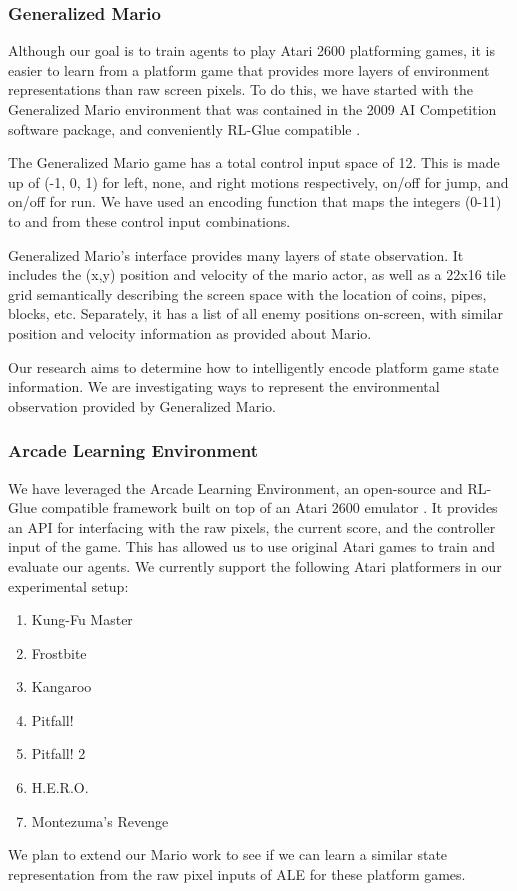 \documentclass{article}
\begin{document}
\subsubsection{Generalized Mario}
Although our goal is to train agents to play Atari 2600 platforming games, it is easier to learn from a platform game that provides more layers of environment representations than raw screen pixels. To do this, we have started with the Generalized Mario environment that was contained in the 2009 AI Competition software package, and conveniently RL-Glue compatible \cite{Togelius10}.

The Generalized Mario game has a total control input space of 12. This is made up of (-1, 0, 1) for left, none, and right motions respectively, on/off for jump, and on/off for run. We have used an encoding function that maps the integers (0-11) to and from these control input combinations. 

Generalized Mario's interface provides many layers of state observation. It includes the (x,y) position and velocity of the mario actor, as well as a 22x16 tile grid semantically describing the screen space with the location of coins, pipes, blocks, etc. Separately, it has a list of all enemy positions on-screen, with similar position and velocity information as provided about Mario. 

Our research aims to determine how to intelligently encode platform game state information. We are investigating ways to represent the environmental observation provided by Generalized Mario.

\subsubsection{Arcade Learning Environment}
We have leveraged the Arcade Learning Environment, an open-source and RL-Glue compatible framework built on top of an Atari 2600 emulator \cite{bellemare13}.  It provides an API for interfacing with the raw pixels, the current score, and the controller input of the game. This has allowed us to use original Atari games to train and evaluate our agents. We currently support the following Atari platformers in our experimental setup:
\begin{enumerate} [topsep=0pt,itemsep=-1ex,partopsep=1ex,parsep=1ex]
\item Kung-Fu Master
\item Frostbite
\item Kangaroo
\item Pitfall!
\item Pitfall! 2
\item H.E.R.O.
\item Montezuma's Revenge
\end{enumerate}
We plan to extend our Mario work to see if we can learn a similar state representation from the raw pixel inputs of ALE for these platform games.
\end{document}
